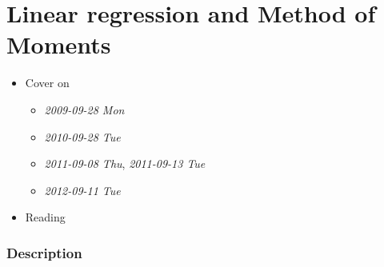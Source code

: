 
\part*{Linear regression and Method of Moments}%

\begin{itemize}
\item Cover on
\begin{itemize}
\item \textit{2009-09-28 Mon}
\item \textit{2010-09-28 Tue}
\item \textit{2011-09-08 Thu}, \textit{2011-09-13 Tue}
\item \textit{2012-09-11 Tue}
\end{itemize}
\item Reading
\end{itemize}
\section{Description}
\label{sec-1}

